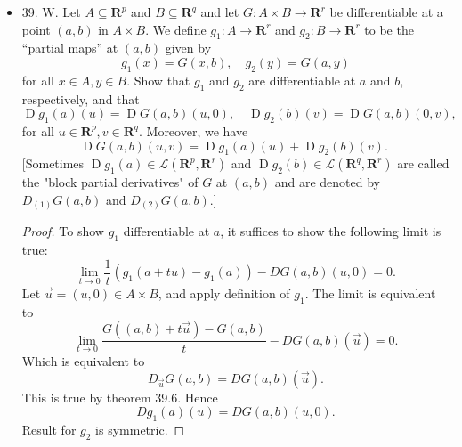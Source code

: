 \begin{itemize}
\begin{proof}
	\[
		\|f(c+tu) - f(c) - \pi_1 DF(c)(tu)\|\le \frac{\varepsilon}{2} \|tu\| \qquad \text{for all }\|tu\|\le \delta(\frac{\varepsilon}{2}) \qquad (2)
	.\] 
	Similarly, we have
	\[
		\|g(c+tu) - g(c) - \pi_2 DF(c)(tu)\|\le \frac{\varepsilon}{2} \|tu\| \qquad \text{for all }\|tu\|\le \delta(\frac{\varepsilon}{2}) \qquad (3)
	.\] 
	where $\pi_2$ is the projection mapping to $\mathbb{R}^r$. Observe the following inequality that holds for all $x \in \mathbb{R}^{q + r}$ and $i = 1, 2$:
	\[
	\|\pi_i x\|\le \|x\| \le \|\pi_1 x\| + \|\pi_2 x\|
	.\] 
	The two statements $(2)$ and $(3)$ are implied by $(1)$, due to the first inequality; and they together imply $(1)$, due to the second inequality.
	
	Now observe that $(2)$ is equivalent to the statement that $f$ is differentiable at $c$ with derivative $\pi DF(c)$, and $(3)$ is equivalent to the statement that $g$ is differentiable at $(c)$ with derivative $\pi_2 DF(c)$. Thus when $f, g$ are both differentiable, we have
	\[
		DF(c) = \left( \pi(DF(c)), \pi_2(DF(c)) \right)  = \left( Df(c), Dg(c) \right) 
	.\] 
\end{proof}

\item 39. W. Let $A \subseteq \boldsymbol{R}^p$ and $B \subseteq \boldsymbol{R}^q$ and let $G: A \times B \rightarrow \mathbf{R}^{r}$ be differentiable at a point $(a, b)$ in $A \times B$. We define $g_1: A \rightarrow \mathbf{R}^r$ and $g_2: B \rightarrow \mathbf{R}^{r}$ to be the ``partial maps'' at $(a, b)$ given by
\[
g_1(x)=G(x, b), \quad g_2(y)=G(a, y)
\]
for all $x \in A, y \in B$. Show that $g_1$ and $g_2$ are differentiable at $a$ and $b$, respectively, and that
\[
\operatorname{D}g_1(a)(u)=\operatorname{D}G(a, b)(u, 0), \quad \operatorname{D}g_2(b)(v)=\operatorname{D}G(a, b)(0, v) \text {, }
\]
for all $u \in \mathbf{R}^p, v \in \mathbf{R}^q$. Moreover, we have
\[
\operatorname{D}G(a, b)(u, v)=\operatorname{D}g_1(a)(u)+\operatorname{D}g_2(b)(v) \text {. }
\]
[Sometimes $\operatorname{D}g_1(a) \in \mathscr{L}\left(\mathbf{R}^p, \mathbf{R}^r\right)$ and $\operatorname{D}g_2(b) \in \mathscr{L}\left(\mathbf{R}^q, \mathbf{R}^r\right)$ are called the "block partial derivatives" of $G$ at $(a, b)$ and are denoted by $D_{(1)} G(a, b)$ and $D_{(2)} G(a, b)$.]
\begin{proof}
	To show $g_1$ differentiable at $a$, it suffices to show the following limit is true:
	\[
		\lim_{t \to 0} \frac{1}{t}\left( g_1(a + t u) - g_1(a) \right) - D G(a, b) (u, 0) = 0
	.\] 
	Let $\vec{u} = (u, 0) \in A \times B$, and apply definition of $g_1$. The limit is equivalent to
	\[
		\lim_{t \to 0} \frac{G\left( (a,b) + t \vec{u}  \right)  - G(a, b)}{t} - DG(a, b)(\vec{u} ) = 0
	.\] 
	Which is equivalent to
	\[
		D_{\vec{u} }G(a,b) = DG(a, b) (\vec{u} )
	.\] 
	This is true by theorem 39.6.
	Hence
	\[
		Dg_1(a)(u) = DG(a,b)(u,0)
	.\] 
	Result for $g_2$ is symmetric.


\end{proof}
\end{itemize}
